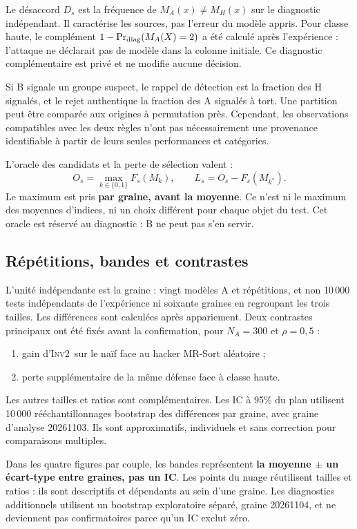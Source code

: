\documentclass[11pt,a4paper]{article}
\newcommand{\Inv}{\textsc{Inv2}}
\begin{document}
Le désaccord $D_s$ est la fréquence de $M_A(x)\neq M_H(x)$ sur le diagnostic
indépendant. Il caractérise les sources, pas l'erreur du modèle appris. Pour
classe haute, le complément $1-\Pr_{\rm diag}(M_A(X)=2)$ a été calculé après
l'expérience : l'attaque ne déclarait pas de modèle dans la colonne initiale.
Ce diagnostic complémentaire est privé et ne modifie aucune décision.

Si B signale un groupe suspect, le rappel de détection est la fraction des H
signalés, et le rejet authentique la fraction des A signalés à tort. Une
partition peut être comparée aux origines à permutation près. Cependant, les
observations compatibles avec les deux règles n'ont pas nécessairement une
provenance identifiable à partir de leurs seules performances et catégories.

L'oracle des candidats et la perte de sélection valent :
\begin{equation}
 O_s=\max_{k\in\{0,1\}}F_s(M_k),\qquad L_s=O_s-F_s(M_{k^*}).
 \label{eq:oracle}
\end{equation}
Le maximum est pris \textbf{par graine, avant la moyenne}. Ce n'est ni le
maximum des moyennes d'indices, ni un choix différent pour chaque objet du test.
Cet oracle est réservé au diagnostic : B ne peut pas s'en servir.

\subsection{Répétitions, bandes et contrastes}

L'unité indépendante est la graine : vingt modèles A et répétitions, et non
10\,000 tests indépendants de l'expérience ni soixante graines en regroupant
les trois tailles. Les différences sont calculées après appariement.
Deux contrastes principaux ont été fixés avant la confirmation, pour
$N_A=300$ et $\rho=0,5$ :
\begin{enumerate}
\item gain d'\Inv\ sur le naïf face au hacker MR-Sort aléatoire ;
\item perte supplémentaire de la même défense face à classe haute.
\end{enumerate}
Les autres tailles et ratios sont complémentaires. Les IC à 95\% du plan
utilisent 10\,000 rééchantillonnages bootstrap des différences par graine,
avec graine d'analyse 20261103. Ils sont approximatifs, individuels et sans
correction pour comparaisons multiples.

Dans les quatre figures par couple, les bandes représentent \textbf{la moyenne
$\pm$ un écart-type entre graines, pas un IC}. Les points du nuage réutilisent
tailles et ratios : ils sont descriptifs et dépendants au sein d'une graine.
Les diagnostics additionnels utilisent un bootstrap exploratoire séparé,
graine 20261104, et ne deviennent pas confirmatoires parce qu'un IC exclut zéro.
\end{document}
